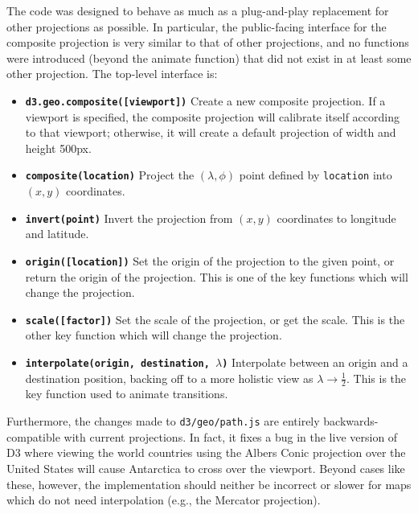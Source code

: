 The code was designed to behave as much as a plug-and-play replacement for
  other projections as possible.
In particular, the public-facing interface for the composite projection is
  very similar to that of other projections, and no functions were introduced
  (beyond the animate function)
  that did not exist in at least some other projection.
The top-level interface is:

\begin{itemize}
  \item[] \textbf{\texttt{d3.geo.composite([viewport])}}
           Create a new composite projection.
           If a viewport is specified, the composite projection will calibrate
           itself according to that viewport; otherwise, it will create a
           default projection of width and height 500px.
  \item[] \textbf{\texttt{composite(location)}}
           Project the $(\lambda,\phi)$ point defined by \texttt{location}
           into $(x,y)$ coordinates.
  \item[] \textbf{\texttt{invert(point)}}
           Invert the projection from $(x,y)$ coordinates to longitude and
           latitude.
  \item[] \textbf{\texttt{origin([location])}}
           Set the origin of the projection to the given point, or return
           the origin of the projection.
           This is one of the key functions which will change the projection.
  \item[] \textbf{\texttt{scale([factor])}}
           Set the scale of the projection, or get the scale.
           This is the other key function which will change the projection.
  \item[] \textbf{\texttt{interpolate(origin, destination, $\lambda$)}}
           Interpolate between an origin and a destination position, backing
           off to a more holistic view as $\lambda \rightarrow \frac{1}{2}$.
           This is the key function used to animate transitions.
\end{itemize}

Furthermore, the changes made to \texttt{d3/geo/path.js} are entirely
  backwards-compatible with current projections.
In fact, it fixes a bug in the live version of D3 where viewing the world
  countries using the Albers Conic projection over the United States will
  cause Antarctica to cross over the viewport.
Beyond cases like these, however, the implementation should neither be incorrect
  or slower for maps which do not need interpolation (e.g., the Mercator
  projection).

